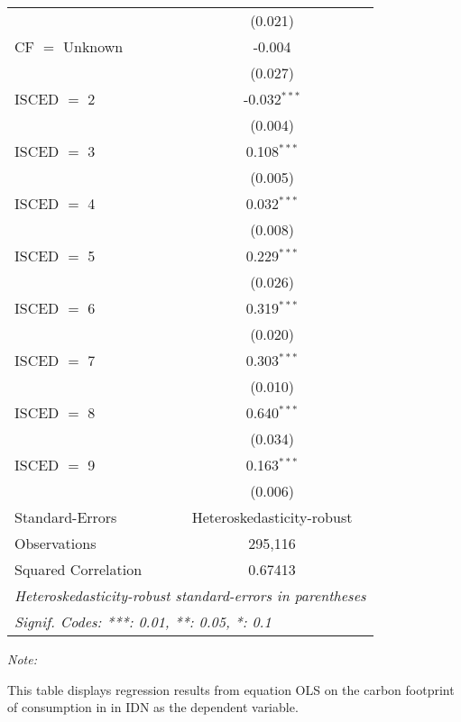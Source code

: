 \begin{table}[htbp!]
\begin{adjustbox}{width = 1\textwidth, max height = 0.95\textheight, center}
\begin{threeparttable}[b]
\begin{tabular}{lc}
                                & (0.021)\\   
            CF $=$ Unknown      & -0.004\\   
                                & (0.027)\\   
            ISCED $=$ 2         & -0.032$^{***}$\\   
                                & (0.004)\\   
            ISCED $=$ 3         & 0.108$^{***}$\\   
                                & (0.005)\\   
            ISCED $=$ 4         & 0.032$^{***}$\\   
                                & (0.008)\\   
            ISCED $=$ 5         & 0.229$^{***}$\\   
                                & (0.026)\\   
            ISCED $=$ 6         & 0.319$^{***}$\\   
                                & (0.020)\\   
            ISCED $=$ 7         & 0.303$^{***}$\\   
                                & (0.010)\\   
            ISCED $=$ 8         & 0.640$^{***}$\\   
                                & (0.034)\\   
            ISCED $=$ 9         & 0.163$^{***}$\\   
                                & (0.006)\\   
            \midrule 
            Standard-Errors     & Heteroskedasticity-robust \\   
            Observations        & 295,116\\  
            Squared Correlation & 0.67413\\  
            \midrule \midrule
            \multicolumn{2}{l}{\emph{Heteroskedasticity-robust standard-errors in parentheses}}\\
            \multicolumn{2}{l}{\emph{Signif. Codes: ***: 0.01, **: 0.05, *: 0.1}}\\
         \end{tabular}
         
         \begin{tablenotes}\item \medskip \textit{Note:}
            \item This table displays regression results from equation OLS on the carbon footprint of consumption in  in IDN as the dependent variable.  
         \end{tablenotes}
      \end{threeparttable}
   \end{adjustbox}
\end{table}


